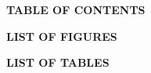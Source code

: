 \newpage
\thispagestyle{plain}

\begin{center}
{\LARGE \bfseries \color{primaryblue} TABLE OF CONTENTS}\\[0.2cm]
\end{center}

\vspace{-0.3cm}
\begingroup
\setcounter{tocdepth}{1}
\renewcommand{\contentsname}{\vspace{-0.8cm}}
{\small
\tableofcontents
}
\endgroup

\vspace{0.5cm}
\begin{center}
{\Large \bfseries \color{primaryblue} LIST OF FIGURES}\\[0.2cm]
\end{center}
\vspace{-0.3cm}
\begingroup
\renewcommand{\listfigurename}{\vspace{-0.8cm}}
{\small
\listoffigures
}
\endgroup

\vspace{0.5cm}
\begin{center}
{\Large \bfseries \color{primaryblue} LIST OF TABLES}\\[0.2cm]
\end{center}
\vspace{-0.3cm}
\begingroup
\renewcommand{\listtablename}{\vspace{-0.8cm}}
{\small
\listoftables
}
\endgroup

